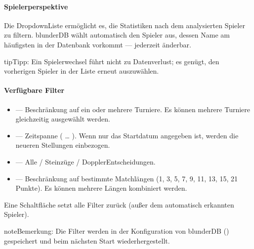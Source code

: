\documentclass[letterpaper,10pt,german]{sphinxmanual}
\begin{document}
\paragraph{Spielerperspektive}
\label{\detokenize{manuel:perspective-joueur}}
\sphinxAtStartPar
Die Dropdown\sphinxhyphen{}Liste  ermöglicht es, die Statistiken nach dem analysierten Spieler zu filtern. blunderDB wählt automatisch den Spieler aus, dessen Name am häufigsten in der Datenbank vorkommt — jederzeit änderbar.

\begin{sphinxadmonition}{tip}{Tipp:}
\sphinxAtStartPar
Ein Spielerwechsel führt nicht zu Datenverlust; es genügt, den vorherigen Spieler in der Liste erneut auszuwählen.
\end{sphinxadmonition}


\paragraph{Verfügbare Filter}
\label{\detokenize{manuel:filtres-disponibles}}\begin{itemize}
\item {} 
\sphinxAtStartPar
{} — Beschränkung auf ein oder mehrere Turniere. Es können mehrere Turniere gleichzeitig ausgewählt werden.

\item {} 
\sphinxAtStartPar
{} — Zeitspanne ( … ). Wenn nur das Startdatum angegeben ist, werden die neueren Stellungen einbezogen.

\item {} 
\sphinxAtStartPar
{} — Alle / Steinzüge / Doppler\sphinxhyphen{}Entscheidungen.

\item {} 
\sphinxAtStartPar
{} — Beschränkung auf bestimmte Matchlängen (1, 3, 5, 7, 9, 11, 13, 15, 21 Punkte). Es können mehrere Längen kombiniert werden.

\end{itemize}

\sphinxAtStartPar
Eine Schaltfläche  setzt alle Filter zurück (außer dem automatisch erkannten Spieler).

\begin{sphinxadmonition}{note}{Bemerkung:}
\sphinxAtStartPar
Die Filter werden in der Konfiguration von blunderDB () gespeichert und beim nächsten Start wiederhergestellt.
\end{sphinxadmonition}
\end{document}
